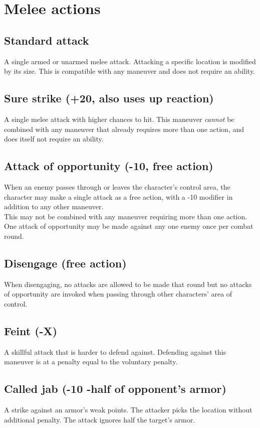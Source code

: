 \section{Melee actions}
\subsection*{Standard attack}
A single armed or unarmed melee attack. Attacking a specific location is modified by its size. This is compatible with any maneuver and does not require an ability.
\subsection*{Sure strike (+20, also uses up reaction)}
A single melee attack with higher chances to hit.
This maneuver \emph{cannot} be combined with any maneuver that already requires more than one action,
	and does itself not require an ability.
\subsection*{Attack of opportunity (-10, free action)}
When an enemy passes through or leaves the character’s control area,
	the character may make a single attack as a free action,
	with a -10 modifier in addition to any other maneuver.\\
This may not be combined with any maneuver requiring more than one action.\\
One attack of opportunity may be made against any one enemy once per combat round.
\subsection*{Disengage (free action)}
\label{action:disengage}
When disengaging, no attacks are allowed to be made that round but no attacks of opportunity are invoked when passing through other characters' area of control.
\subsection*{Feint (-X)}
A skillful attack that is harder to defend against. Defending against this maneuver is at a penalty equal to the voluntary penalty.
\subsection*{Called jab (-10 -half of opponent’s armor)}
A strike against an armor’s weak points. The attacker picks the location without additional penalty. The attack ignores half the target’s armor.
